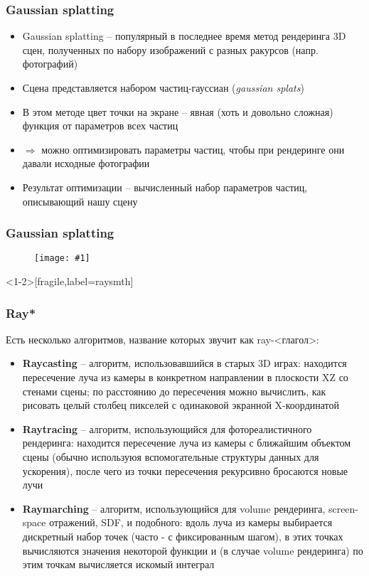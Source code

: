 \documentclass[10pt]{beamer}
\newcommand{\slideimage}[1]{
  \begin{figure}
    \begin{adjustbox}{width=\textwidth, totalheight=\textheight-2\baselineskip-2\baselineskip,keepaspectratio}
      \texttt{[image: \#1]}
    \end{adjustbox}
  \end{figure}
}
\begin{document}
\begin{frame}[fragile]
\frametitle{Gaussian splatting}
\begin{itemize}
\item Gaussian splatting -- популярный в последнее время метод рендеринга 3D сцен, полученных по набору изображений с разных ракурсов (напр. фотографий)
\pause
\item Сцена представляется набором частиц-гауссиан (\textit{gaussian splats})
\pause
\item В этом методе цвет точки на экране -- явная (хоть и довольно сложная) функция от параметров всех частиц
\pause
\item \begin{math}\Longrightarrow\end{math} можно оптимизировать параметры частиц, чтобы при рендеринге они давали исходные фотографии
\pause
\item Результат оптимизации -- вычисленный набор параметров частиц, описывающий нашу сцену
\end{itemize}
\end{frame}

\begin{frame}[fragile]
\frametitle{Gaussian splatting}
\slideimage{gaussian_splatting.png}
\end{frame}

\begin{frame}<1-2>[fragile,label=raysmth]
\fontsize{10pt}{10pt}
\frametitle{Ray*}
Есть несколько алгоритмов, название которых звучит как ray-<глагол>:
\pause
\begin{itemize}
\item \textbf{Raycasting} -- алгоритм, использовавшийся в старых 3D играх: находится пересечение луча из камеры в конкретном направлении в плоскости XZ со стенами сцены; по расстоянию до пересечения можно вычислить, как рисовать целый столбец пикселей с одинаковой экранной X-координатой
\pause
\item \textbf{Raytracing} -- алгоритм, использующийся для фотореалистичного рендеринга: находится пересечение луча из камеры с ближайшим объектом сцены (обычно используюя вспомогательные структуры данных для ускорения), после чего из точки пересечения рекурсивно бросаются новые лучи
\pause
\item \textbf{Raymarching} -- алгоритм, использующийся для volume рендеринга, screen-space отражений, SDF, и подобного: вдоль луча из камеры выбирается дискретный набор точек (часто - с фиксированным шагом), в этих точках вычисляются значения некоторой функции и (в случае volume рендеринга) по этим точкам вычисляется искомый интеграл
\end{itemize}
\end{frame}
\end{document}
